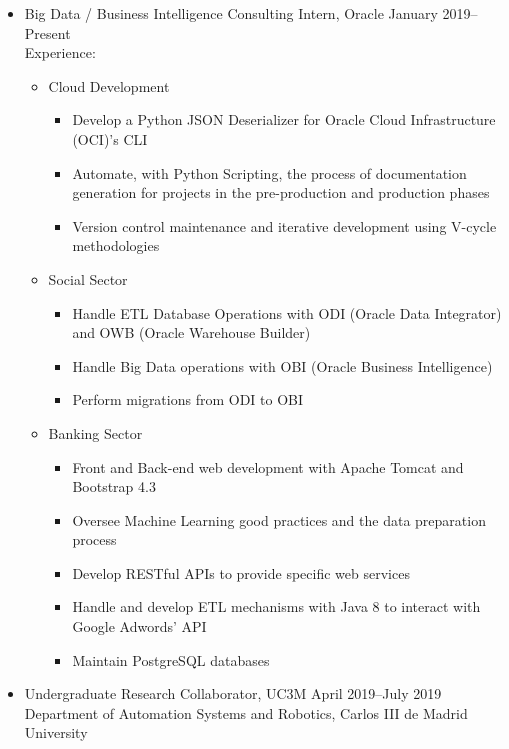 \documentclass[11pt]{article}
\begin{document}
\begin{itemize}[leftmargin=12pt]
  \item[] Big Data / Business Intelligence Consulting Intern, Oracle \hfill January 2019--Present \\
  Experience: 
  \begin{itemize}
        \item Cloud Development
        \begin{itemize}
            \item Develop a Python JSON Deserializer for Oracle Cloud Infrastructure (OCI)'s CLI 
            \item Automate, with Python Scripting, the process of documentation generation for projects in the pre-production and production phases\textbf{}
            \item Version control maintenance and iterative development using V-cycle methodologies 
        \end{itemize}
      \item Social Sector
      \begin{itemize}
          \item Handle ETL Database Operations with ODI (Oracle Data Integrator) and OWB (Oracle Warehouse Builder)
          \item Handle Big Data operations with OBI (Oracle Business Intelligence)
          \item Perform migrations from ODI to OBI
      \end{itemize}
      \item Banking Sector
      \begin{itemize}
          \item Front and Back-end web development with Apache Tomcat and Bootstrap 4.3 
          \item Oversee Machine Learning good practices and the data preparation process
          \item Develop RESTful APIs to provide specific web services
          \item Handle and develop ETL mechanisms with Java 8 to interact with Google Adwords' API
          \item Maintain PostgreSQL databases  
      \end{itemize}
  \end{itemize}
  \item[] Undergraduate Research Collaborator, UC3M \hfill April 2019--July 2019 \\
    Department of Automation Systems and Robotics, Carlos III de Madrid University \\

\end{itemize}
\end{document}
